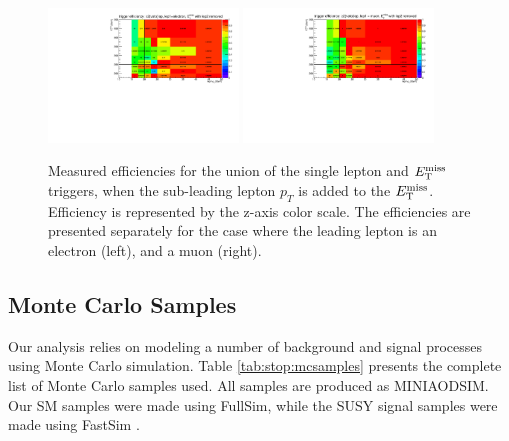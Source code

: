 \begin{figure}[htb]
\centering
\includegraphics[width=0.45\textwidth]{figures/TriggerEff2l_el.pdf}
\includegraphics[width=0.45\textwidth]{figures/TriggerEff2l_mu.pdf}
\caption{Measured efficiencies for the union of the single lepton and
  $E_\text{T}^\text{miss}$ triggers, when the sub-leading lepton $p_T$ is added to the
  $E_\text{T}^\text{miss}$. Efficiency is represented by the z-axis color scale. The
  efficiencies are presented separately for the case where
  the leading lepton is an electron (left), and a muon (right).}
\label{fig:stop:trigeff:2ndlepplusmet}
\end{figure}

\subsection{Monte Carlo Samples}
\label{ssec:stop:mcsamples}

Our analysis relies on modeling a number of background and signal
processes using Monte Carlo simulation. Table \ref{tab:stop:mcsamples}
presents the complete list of Monte Carlo samples used. All samples
are produced as MINIAODSIM. Our SM samples were made using FullSim,
while the SUSY signal samples were made using FastSim \cite{fastsim}.

